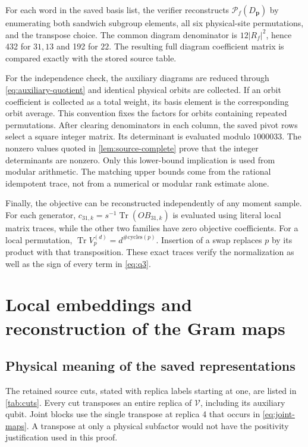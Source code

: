 \documentclass[aps,pra,reprint,superscriptaddress,amsmath,amssymb,floatfix,nofootinbib]{revtex4-2}
\newcommand{\Tr}{\operatorname{Tr}}
\begin{document}
For each word in the saved basis list, the verifier reconstructs
$\mathcal P_f(D_{\boldsymbol p})$ by enumerating both sandwich subgroup
elements, all six physical-site permutations, and the transpose choice.
The common diagram denominator is $12|R_f|^2$, hence 432 for $31,13$
and 192 for $22$.
The resulting full diagram coefficient matrix is compared exactly with
the stored source table.

For the independence check, the auxiliary diagrams are reduced through
\cref{eq:auxiliary-quotient} and identical physical orbits are collected.
If an orbit coefficient is collected as a total weight, its basis element
is the corresponding orbit average. This convention fixes the factors
for orbits containing repeated permutations.
After clearing denominators in each column, the saved pivot rows select
a square integer matrix. Its determinant is evaluated modulo $1000033$.
The nonzero values quoted in \cref{lem:source-complete} prove that the
integer determinants are nonzero.
Only this lower-bound implication is used from modular arithmetic.
The matching upper bounds come from the rational idempotent trace,
not from a numerical or modular rank estimate alone.

Finally, the objective can be reconstructed independently of any moment
sample. For each generator,
$c_{31,k}=s^{-1}\Tr(OB_{31,k})$ is evaluated using literal local matrix
traces, while the other two families have zero objective coefficients.
For a local permutation, $\Tr V_p^{(d)}=d^{\#\mathrm{cycles}(p)}$.
Insertion of a swap replaces $p$ by its product with that transposition.
These exact traces verify the normalization as well as the sign of every
term in \cref{eq:q3}.

\section{Local embeddings and reconstruction of the Gram maps}
\label{app:gram}

\subsection{Physical meaning of the saved representations}

The retained source cuts, stated with replica labels starting at one,
are listed in \cref{tab:cuts}. Every cut transposes an entire replica of
$\mathcal V$, including its auxiliary qubit. Joint blocks use the
single transpose at replica 4 that occurs in \cref{eq:joint-maps}.
A transpose at only a physical subfactor would not have the positivity
justification used in this proof.
\end{document}
